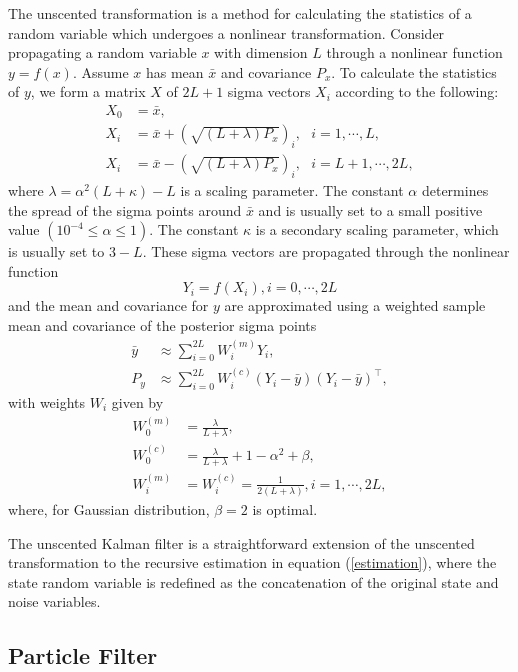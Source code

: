 The unscented transformation is a method for calculating the statistics of a random variable which undergoes a nonlinear transformation. Consider propagating a random variable $x$ with dimension $L$ through a nonlinear function $y=f(x)$. Assume $x$ has mean $\bar{x}$ and covariance $P_x$. To calculate the statistics of $y$, we form a matrix $X$ of $2L+1$ sigma vectors $X_i$ according to the following:
\begin{equation}\label{UT}
\begin{split}
X_0 &= \bar{x},\\
X_i &= \bar{x} + \left(\sqrt{(L+\lambda)P_x}\right)_i, \mbox{    } i=1,\cdots, L, \\
X_i &= \bar{x} - \left(\sqrt{(L+\lambda)P_x}\right)_i,  \mbox{    } i=L+1,\cdots, 2L,
\end{split}
\end{equation}
where $\lambda = \alpha^2(L+\kappa)-L$ is a scaling parameter. The constant $\alpha$ determines the spread of the sigma points around $\bar{x}$ and is usually set to a small positive value $(10^{-4}\leq \alpha \leq 1)$. The constant $\kappa$ is a secondary scaling parameter, which is usually set to $3-L$. These sigma vectors are propagated through the nonlinear function
\begin{equation*}
Y_i = f(X_i), i=0, \cdots, 2L
\end{equation*}
and the mean and covariance for $y$ are approximated using a weighted sample mean and covariance of the posterior sigma points
\begin{align*}
\bar{y} &\approx \sum_{i=0}^{2L}W_i^{(m)}Y_i,\\
P_y &\approx \sum_{i=0}^{2L}W_i^{(c)}(Y_i-\bar{y})(Y_i-\bar{y})^\top,
\end{align*}
with weights $W_i$ given by
\begin{align*}
W_0^{(m)} &=\frac{\lambda}{L+\lambda},\\
W_0^{(c)} &=\frac{\lambda}{L+\lambda}+1-\alpha^2+\beta,\\
W_i^{(m)} &=W_i^{(c)} = \frac{1}{2(L+\lambda)}, i=1,\cdots, 2L,
\end{align*}
where, for Gaussian distribution, $\beta=2$ is optimal.

The unscented Kalman filter is a straightforward extension of the unscented transformation to the recursive estimation in equation (\ref{estimation}), where the state random variable is redefined as the concatenation of the original state and noise variables. 

\subsection*{Particle Filter}

